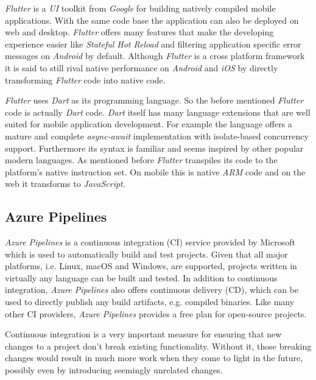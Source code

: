 \textit{Flutter} is a \textit{UI} toolkit from \textit{Google} for building natively compiled mobile
applications. With the same code base the application can also be deployed on web and desktop.
\textit{Flutter} offers many features that make the developing experience easier like
\textit{Stateful Hot Reload} and filtering application specific error messages on \textit{Android}
by default. Although \textit{Flutter} is a cross platform framework it is said to still rival native
performance on \textit{Android} and \textit{iOS} by directly transforming \textit{Flutter} code into
native code.
\cite{flutter}

\textit{Flutter} uses \textit{Dart} as its programming language. So the before mentioned \textit{Flutter}
code is actually \textit{Dart} code. \textit{Dart} itself has many language extensions that are well
suited for mobile application development. For example the language offers a mature and complete
\textit{async-await} implementation with isolate-based concurrency support. Furthermore its syntax
is familiar and seems inspired by other popular modern languages. As mentioned before
\textit{Flutter} transpiles its code to the platform's native instruction set. On mobile this is
native \textit{ARM} code and on the web it transforms to \textit{JavaScript}. \cite{dart}

\subsection{Azure Pipelines}

\textit{Azure Pipelines} is a continuous integration (CI) service provided by Microsoft which is
used to automatically build and test projects. Given that all major platforms, i.e. Linux, macOS and
Windows, are supported, projects written in virtually any language can be built and tested. In
addition to continuous integration, \textit{Azure Pipelines} also offers continuous delivery (CD),
which can be used to directly publish any build artifacts, e.g. compiled binaries. Like many other
CI providers, \textit{Azure Pipelines} provides a free plan for open-source projects.
\cite{azure-pipelines}

Continuous integration is a very important measure for ensuring that new changes to a project don't
break existing functionality. Without it, those breaking changes would result in much more work when
they come to light in the future, possibly even by introducing seemingly unrelated changes.
